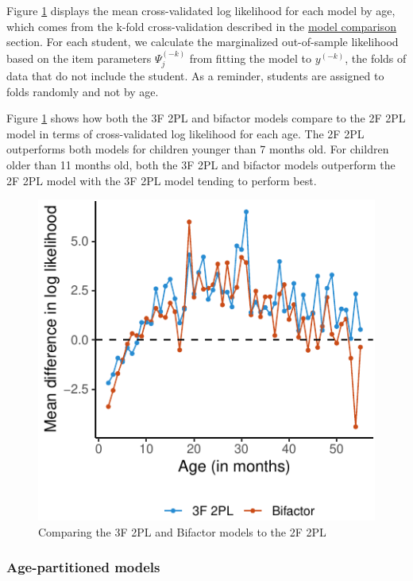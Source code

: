 \documentclass[10pt, letterpaper]{article}
\newenvironment{CodeChunk}{}{}
\begin{document}
Figure \ref{fig:byage} displays the mean cross-validated log likelihood
for each model by age, which comes from the k-fold cross-validation
described in the \protect\hyperlink{modelcompare}{model comparison}
section. For each student, we calculate the marginalized out-of-sample
likelihood based on the item parameters \(\Psi_j^{(-k)}\) from fitting
the model to \(y^{(-k)}\), the folds of data that do not include the
student. As a reminder, students are assigned to folds randomly and not
by age.

Figure \ref{fig:byage} shows how both the 3F 2PL and bifactor models
compare to the 2F 2PL model in terms of cross-validated log likelihood
for each age. The 2F 2PL outperforms both models for children younger
than 7 months old. For children older than 11 months old, both the 3F
2PL and bifactor models outperform the 2F 2PL model with the 3F 2PL
model tending to perform best.

\begin{CodeChunk}
\begin{figure}[tb]
\includegraphics{figs/byage-1} \caption[Comparing the 3F 2PL and Bifactor models to the 2F 2PL]{Comparing the 3F 2PL and Bifactor models to the 2F 2PL}\label{fig:byage}
\end{figure}
\end{CodeChunk}

\vskip 0.1in

\hypertarget{age-partitioned-models}{%
\subsubsection{Age-partitioned models}\label{age-partitioned-models}}
\end{document}
